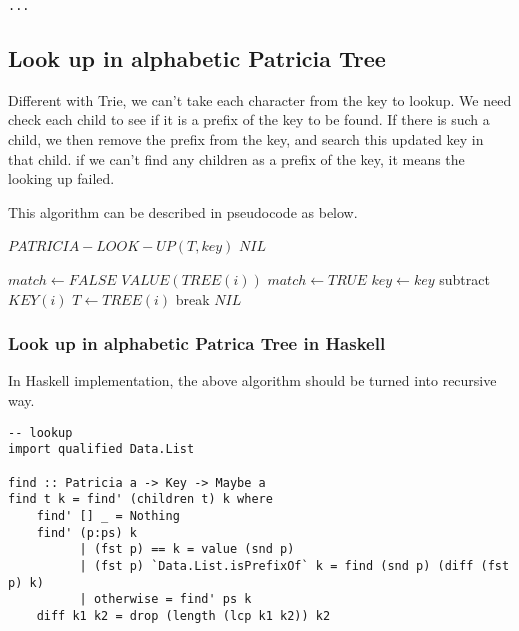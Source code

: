 \documentclass{article}
\begin{document}
\lstset{language=lisp}
\begin{lstlisting}
...
\end{lstlisting}

\subsection{Look up in alphabetic Patricia Tree}
Different with Trie, we can't take each character from the key to lookup.
We need check each child to see if it is a prefix of the key to be found.
If there is such a child, we then remove the prefix from 
the key, and search this updated key in that child. if we can't find any
children as a prefix of the key, it means the looking up failed.

This algorithm can be described in pseudocode as below.
\begin{algorithmic}
\STATE $PATRICIA-LOOK-UP(T, key)$
     \RETURN $NIL$ \ENDIF

  \REPEAT
    \STATE $match \leftarrow FALSE$
        \RETURN $VALUE(TREE(i))$
      \ENDIF
        \STATE $match \leftarrow TRUE$
        \STATE $key \leftarrow key$ subtract $KEY(i)$
        \STATE $T \leftarrow TREE(i)$
        \STATE break
      \ENDIF
    \ENDFOR
  \RETURN $NIL$
\end{algorithmic}

\subsubsection*{Look up in alphabetic Patrica Tree in Haskell}
In Haskell implementation, the above algorithm should be turned
into recursive way. 

\lstset{language=Haskell}
\begin{lstlisting}
-- lookup
import qualified Data.List

find :: Patricia a -> Key -> Maybe a
find t k = find' (children t) k where
    find' [] _ = Nothing
    find' (p:ps) k
          | (fst p) == k = value (snd p)
          | (fst p) `Data.List.isPrefixOf` k = find (snd p) (diff (fst p) k)
          | otherwise = find' ps k
    diff k1 k2 = drop (length (lcp k1 k2)) k2
\end{lstlisting}
\end{document}

